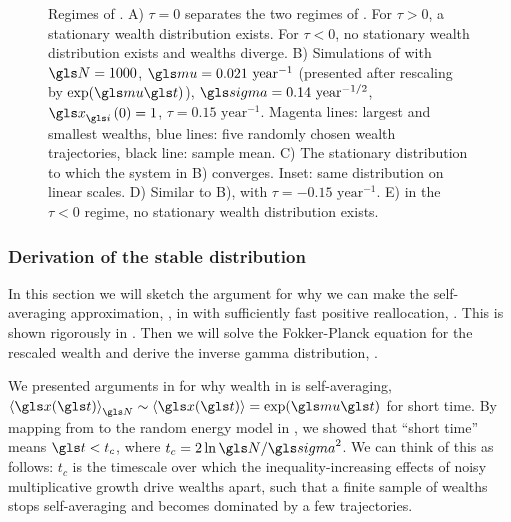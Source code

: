 \begin{figure}[!htb]
\caption{Regimes of \RGBM. A) $\tau=0$ separates the two regimes of \RGBM. For $\tau>0$, a stationary wealth distribution exists. For $\tau<0$, no stationary wealth distribution exists and wealths diverge. B) Simulations of \RGBM with $\N=1000$, $\gmu=0.021 \text{ year}^{-1}$ (presented after rescaling by $\exp(\gmu \t)$), $\gsigma=0.14\text{ year}^{-1/2}$, $\x_\gi\left(0\right)=1$, $\tau=0.15 \text{ year}^{-1}$. Magenta lines: largest and smallest wealths, blue lines: five randomly chosen wealth trajectories, black line: sample mean. C) The stationary distribution to which the system in B) converges. Inset: same distribution on linear scales. D) Similar to B), with $\tau=-0.15 \text{ year}^{-1}$. E) in the $\tau<0$ regime, no stationary wealth distribution exists.}
\end{figure}


\subsubsection{Derivation of the stable distribution}
In this section we will sketch the argument for why we can make the self-averaging approximation, , in \RGBM with sufficiently fast positive reallocation, . This is shown rigorously in \cite{Bouchaud2015b}. Then we will solve the Fokker-Planck equation for the rescaled wealth and derive the inverse gamma distribution, .

We presented arguments in  for why wealth in \GBM is self-averaging, $\ave{\x(\t)}_\N\sim\ave{\x(\t)}=\exp(\gmu \t)$ for short time. By mapping from \GBM to the random energy model in , we showed that ``short time'' means $\t<t_c$, where $t_c=2\ln \N/\gsigma^2$. We can think of this as follows: $t_c$ is the timescale over which the inequality-increasing effects of noisy multiplicative growth drive wealths apart, such that a finite sample of wealths stops self-averaging and becomes dominated by a few trajectories.

